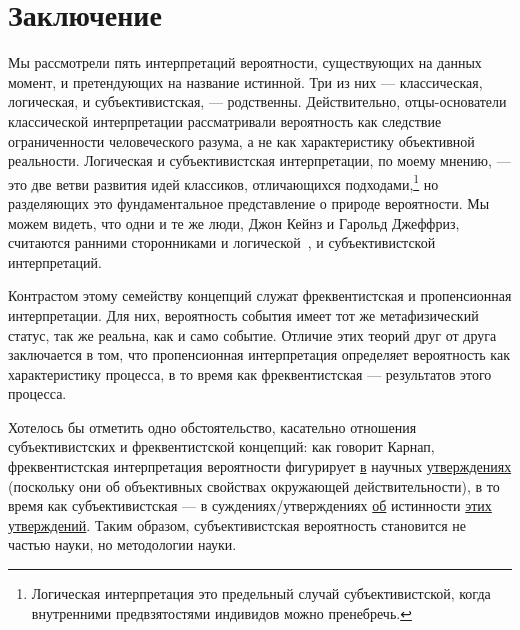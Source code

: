 \documentclass[14pt, a4paper, pdftex]{extarticle}
\begin{document}
\section*{Заключение}
Мы рассмотрели пять интерпретаций вероятности, существующих на данных момент, и претендующих на название истинной. Три из них --- классическая, логическая, и субъективистская, --- родственны. Действительно, отцы-основатели классической интерпретации рассматривали вероятность как следствие ограниченности человеческого разума, а не как характеристику объективной реальности. Логическая и субъективистская интерпретации, по моему мнению, --- это две ветви развития идей классиков, отличающихся подходами,\footnote{Логическая интерпретация это предельный случай субъективистской, когда внутренними предвзятостями индивидов можно пренебречь.} но разделяющих это фундаментальное представление о природе вероятности. Мы можем видеть, что одни и те же люди, Джон Кейнз и Гарольд Джеффриз, считаются ранними сторонниками и логической~\cite[раз. 3.2 пар. 2]{Hajek}, и субъективистской~\cite[стр. 5--7]{Carnap} интерпретаций.

Контрастом этому семейству концепций служат фреквентистская и пропенсионная интерпретации. Для них, вероятность события имеет тот же метафизический статус, так же реальна, как и само событие. Отличие этих теорий  друг от друга заключается в том, что пропенсионная интерпретация определяет вероятность как характеристику процесса, в то время как фреквентистская --- результатов этого процесса.

Хотелось бы отметить одно обстоятельство, касательно отношения субъективистских и фреквентистской концепций: как говорит Карнап,~\cite[стр. 7]{Carnap} фреквентистская интерпретация вероятности фигурирует \underline{в} научных \underline{утверждениях} (поскольку они об объективных свойствах окружающей действительности), в то время как субъективистская --- в суждениях/утверждениях \underline{об} истинности \underline{этих утверждений}. Таким образом, субъективистская вероятность становится не частью науки, но методологии науки.
\end{document}

